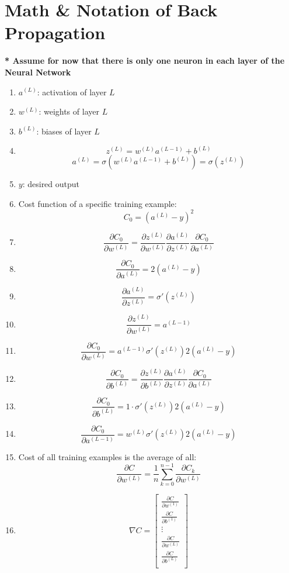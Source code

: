 \documentclass{article}
\begin{document}
\section{Math \& Notation of Back Propagation}
    \textbf{* Assume for now that there is only one neuron in each layer of the Neural Network}
    \begin{enumerate}
        \item $a^{(L)}$: activation of layer $L$
        \item $w^{(L)}$: weights of layer $L$
        \item $b^{(L)}$: biases of layer $L$
        \item $$z^{(L)}=w^{(L)}a^{(L-1)}+b^{(L)}$$
 $$a^{(L)}=\sigma(w^{(L)}a^{(L-1)}+b^{(L)})=\sigma(z^{(L)})$$
        \item $y$: desired output
        \item Cost function of a specific training example: $$C_0=(a^{(L)}-y)^2$$
        \item $$\frac{\partial C_0}{\partial w^{(L)}}=\frac{\partial z^{(L)}}{\partial w^{(L)}} \frac{\partial a^{(L)}}{\partial z^{(L)}} \frac{\partial C_0}{\partial a^{(L)}}$$
        \item $$\frac{\partial C_0}{\partial a^{(L)}}=2(a^{(L)}-y)$$
        \item $$\frac{\partial a^{(L)}}{\partial z^{(L)}}=\sigma'(z^{(L)})$$
        \item $$\frac{\partial z^{(L)}}{\partial w^{(L)}}=a^{(L-1)}$$
        \item $$\frac{\partial C_0}{\partial w^{(L)}}=a^{(L-1)}\sigma'(z^{(L)})2(a^{(L)}-y)$$
        \item $$\frac{\partial C_0}{\partial b^{(L)}}=\frac{\partial z^{(L)}}{\partial b^{(L)}} \frac{\partial a^{(L)}}{\partial z^{(L)}} \frac{\partial C_0}{\partial a^{(L)}}$$
        \item $$\frac{\partial C_0}{\partial b^{(L)}}=1\cdot\sigma'(z^{(L)})2(a^{(L)}-y)$$
        \item $$\frac{\partial C_0}{\partial a^{(L-1)}}=w^{(L)}\sigma'(z^{(L)})2(a^{(L)}-y)$$
        \item Cost of all training examples is the average of all: $$\frac{\partial C}{\partial w^{(L)}}=\frac{1}{n}\sum^{n-1}_{k=0}\frac{\partial C_k}{\partial w^{(L)}}$$
        \item $$\nabla C = 
            \begin{bmatrix}
                \frac{\partial C}{\partial w^{(1)}} \\
                \frac{\partial C}{\partial b^{(1)}} \\
                \vdots \\
                \frac{\partial C}{\partial w^{(L)}} \\
                \frac{\partial C}{\partial b^{(L)}} \\
            \end{bmatrix}$$
    \end{enumerate}
\end{document}
